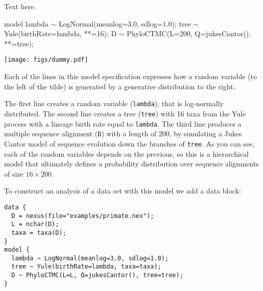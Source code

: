 \documentclass[oneside]{article}
\begin{document}
\begin{tcolorbox}[breakable, width=\textwidth, colback=gray!10, boxrule=0pt,
  title=Box 1: A simple molecular phylogenetic model, fonttitle=\bfseries]
  \small 
  Text here.

  \hspace{-1cm}
  \begin{minipage}[b]{0.7\textwidth}
    {\singlespacing
      \begin{lphylisting}
        model {
          lambda $\sim$ LogNormal(meanlog=3.0, sdlog=1.0);
          tree $\sim$ Yule(birthRate=lambda, *\color{grayargs}{n}*=16);
          D $\sim$ PhyloCTMC(L=200, Q=jukesCantor(),
          *\color{grayargs}{tree}*=tree);
        }
      \end{lphylisting}
    }
  \end{minipage}
  \begin{minipage}[b]{0.3\textwidth}
    \texttt{[image: figs/dummy.pdf]}
  \end{minipage}


\end{tcolorbox}
Each of the lines in this model specification expresses how a random
variable (to the left of the tilde) is generated by a generative
distribution to the right. 

The first line creates a random variable (\texttt{lambda}), that is
log-normally distributed.
The second line creates a tree (\texttt{tree}) with 16 taxa from the
Yule process with a lineage birth rate equal to \texttt{lambda}.
The third line produces a multiple sequence alignment (\texttt{D})
with a length of 200, by simulating a Jukes Cantor model of sequence
evolution down the branches of  \texttt{tree}.
As you can see, each of the random variables depends on the previous,
so this is a hierarchical model that ultimately defines a probability
distribution over sequence alignments of size $16 \times 200$.

To construct an analysis of a data set with this model we add a data block:

{\singlespacing
\begin{verbatim}
data {
  D = nexus(file="examples/primate.nex");
  L = nchar(D);
  taxa = taxa(D);
}
model {
  lambda ~ LogNormal(meanlog=3.0, sdlog=1.0);
  tree ~ Yule(birthRate=lambda, taxa=taxa);
  D ~ PhyloCTMC(L=L, Q=jukesCantor(), tree=tree);
}
\end{verbatim}
}
\end{document}
